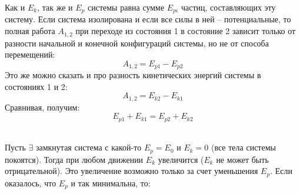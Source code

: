 \documentclass[12pt,epsfig,color,russian]{article}
\begin{document}
Как и $E_k$, так же и $E_p$ системы равна сумме $E_{pi}$ частиц, составляющих эту систему. Если система изолирована и если все силы в ней -- потенциальные, то полная работа $A_{1,2}$ при переходе из состояния 1 в состояние 2 зависит только от разности начальной и конечной конфигураций системы, но не от способа перемещений:
   \begin{displaymath}
   A_{1,2}=E_{p1}-E_{p2}
   \end{displaymath}
Это же можно сказать и про разность кинетических энергий системы в состояниях 1 и 2:
   \begin{displaymath}
   A_{1,2}=E_{k2}-E_{k1}
   \end{displaymath}
Сравнивая, получим:
   \begin{displaymath}
   E_{p1}+E_{k1}=E_{p2}+E_{k2}
   \end{displaymath}

\\[2mm]

Пусть $\exists$ замкнутая система с какой-то $E_p=E_0$ и $E_k=0$ (все тела системы покоятся). Тогда при любом движении $E_k$ увеличится ($E_k$ не может быть отрицательной). Это увеличение возможно только за счет уменьшения $E_p$. Если оказалось, что $E_p$ и так минимальна, то: \\

\\[2mm]
\end{document}
